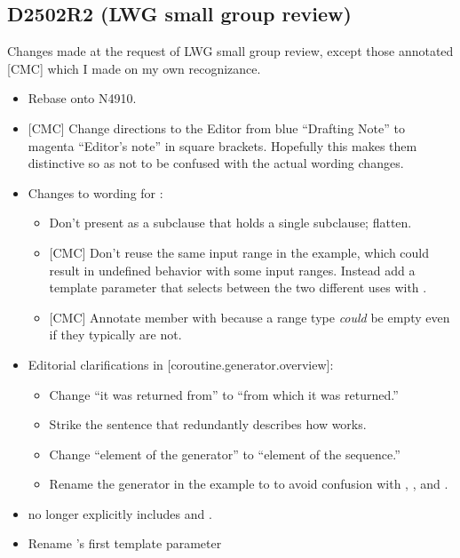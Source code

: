 \documentclass{wg21}
\begin{document}
\subsection{D2502R2 (LWG small group review)}
Changes made at the request of LWG small group review, except those annotated
[CMC] which I made on my own recognizance.
\begin{itemize}
\item Rebase onto N4910.
\item{} [CMC] Change directions to the Editor from blue ``Drafting Note'' to
  magenta ``Editor's note'' in square brackets. Hopefully this makes them
  distinctive so as not to be confused with the actual wording changes.
\item Changes to wording for :
  \begin{itemize}
    \item Don't present as a subclause that holds a single subclause; flatten.
    \item{} [CMC] Don't reuse the same input range in the example, which could
      result in undefined behavior with some input ranges. Instead add a
       template parameter that selects between the two different
      uses with .
    \item{} [CMC] Annotate member 
      with 
      because a range type \emph{could} be empty
      even if they typically are not.
  \end{itemize}
\item Editorial clarifications in [coroutine.generator.overview]:
  \begin{itemize}
    \item Change ``it was returned from'' to ``from which it was returned.''
    \item Strike the sentence that redundantly describes how 
      works.
    \item Change ``element of the generator'' to ``element of the sequence.''
    \item Rename the  generator in the example to 
      to avoid confusion with , ,
      and .
  \end{itemize}
\item {} no longer explicitly includes
   and .
\item Rename 's first template parameter

\end{itemize}
\end{document}
